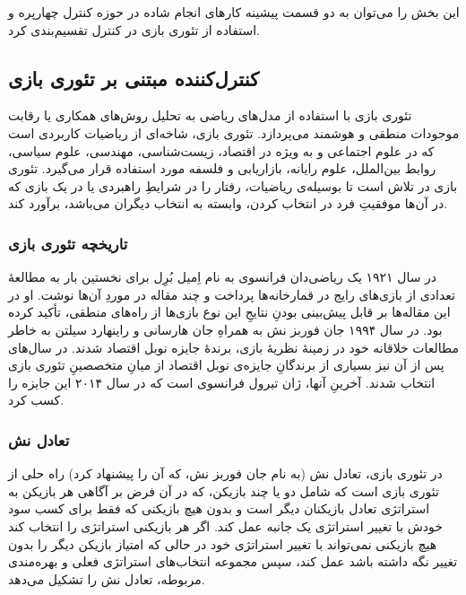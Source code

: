این بخش را می‌توان به دو قسمت پیشینه کارهای انجام شاده در حوزه کنترل چهارپره و استفاده از تئوری بازی
در کنترل تقسیم‌بندی کرد.
\subsection{کنترل‌کننده مبتنی بر تئوری بازی}
تئوری بازی با استفاده از مدل‌های ریاضی به تحلیل روش‌های همکاری یا رقابت موجودات منطقی و هوشمند می‌پردازد. تئوری بازی، شاخه‌ای از ریاضیات کاربردی است که در علوم اجتماعی و به ویژه در اقتصاد، زیست‌شناسی، مهندسی، علوم سیاسی، روابط بین‌الملل، علوم رایانه، بازاریابی و فلسفه مورد استفاده قرار می‌گیرد. تئوری بازی در تلاش است تا بوسیله‌ی ریاضیات، رفتار را در شرایطِ راهبردی یا در یک بازی که در آن‌ها موفقیتِ فرد در انتخاب کردن، وابسته به انتخاب دیگران می‌باشد، برآورد کند.
\subsubsection{تاریخچه تئوری بازی}
در سال ۱۹۲۱ یک ریاضی‌دان فرانسوی به نام اِمیل بُرِل برای نخستین بار به مطالعهٔ تعدادی از بازی‌های رایج در قمارخانه‌ها پرداخت و چند مقاله در موردِ آن‌ها نوشت. او در این مقاله‌ها بر قابل پیش‌بینی بودنِ نتایجِ این نوع بازی‌ها از راه‌های منطقی، تأکید کرده بود. در سال ۱۹۹۴ جان فوربز نش به همراهِ جان هارسانی و راینهارد سیلتن به خاطر مطالعات خلاقانه خود در زمینهٔ نظریهٔ بازی، برندهٔ جایزه نوبل اقتصاد شدند. در سال‌های پس از آن نیز بسیاری از برندگانِ جایزه‌ی نوبل اقتصاد از میانِ متخصصینِ تئوری بازی انتخاب شدند. آخرینِ آنها، ژان تیرول فرانسوی است که در سال ۲۰۱۴ این جایزه را کسب کرد.
\subsubsection{تعادل نش}
در تئوری بازی، تعادل نش (به نام جان فوربز نش، که آن را پیشنهاد کرد) راه حلی از تئوری بازی است که شامل دو یا چند بازیکن، که در آن فرض بر آگاهی هر بازیکن به استراتژی تعادل بازیکنان دیگر است و بدون هیچ بازیکنی که فقط برای کسب سود خودش با تغییر استراتژی یک جانبه عمل کند. اگر هر بازیکنی استراتژی را انتخاب کند هیچ بازیکنی نمی‌تواند با تغییر استراتژی خود در حالی که امتیاز بازیکن دیگر را بدون تغییر نگه داشته باشد عمل کند، سپس مجموعه انتخاب‌های استراتژی فعلی و بهره‌مندی مربوطه، تعادل نش را تشکیل می‌دهد.
